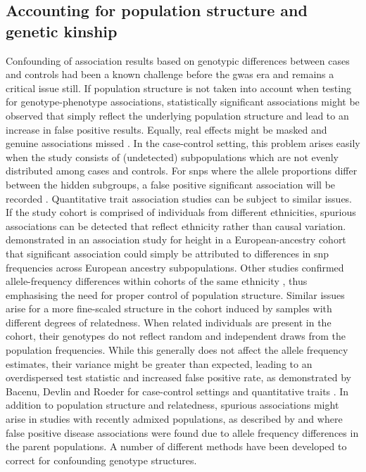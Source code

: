 \subsection{Accounting for population structure and genetic kinship}
\label{subsection:population-structure}

Confounding of association results based on genotypic differences between cases and controls had been a known challenge before the \gls{gwas} era \citep{Spielman1993} and remains a critical issue still. If population structure is not taken into account when testing for genotype-phenotype associations, statistically significant associations might be observed that simply reflect the underlying population structure and lead to an increase in false positive results. Equally, real effects might be masked and genuine associations missed \citep{Marchini2004}. In the case-control setting, this problem arises easily when the study consists of (undetected) subpopulations which are not evenly distributed among cases and controls. For \glspl{snp} where the allele proportions differ between the hidden subgroups, a false positive significant association will be recorded \citep{Marchini2004,Balding2006}. Quantitative trait association studies can be subject to similar issues. If the study cohort is comprised of individuals from different ethnicities, spurious associations can be detected that reflect ethnicity rather than causal variation. \citet{Campbell2005} demonstrated in an association study for height in a European-ancestry cohort that significant association could simply be attributed to differences in \gls{snp} frequencies across European ancestry subpopulations.  Other studies confirmed allele-frequency differences within cohorts of the same ethnicity \citep{Tian2008a,Tian2008b}, thus emphasising the need for proper control of population structure. Similar issues arise for a more fine-scaled structure in the cohort induced by samples with different degrees of relatedness. When related individuals are present in the cohort, their genotypes do not reflect random and independent draws from the population frequencies. While this generally does not affect the allele frequency estimates, their variance might be greater than expected, leading to an overdispersed test statistic and increased false positive rate, as demonstrated by Bacenu, Devlin and Roeder for case-control settings and quantitative traits \citep{Devlin1999, Bacanu2002}. In addition to population structure and relatedness, spurious associations might arise in studies with recently admixed populations, as described by \citet{Lander1994} and \citet{Ewens1995} where false positive disease associations were found due to allele frequency differences in the parent populations. A number of different methods have been developed to correct for confounding genotype structures.

